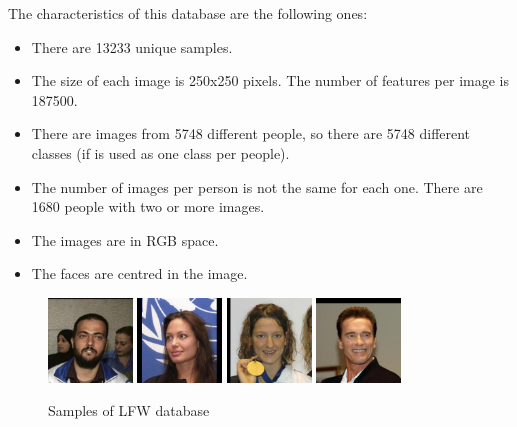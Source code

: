 The characteristics of this database are the following ones:
\begin{itemize}
 \item There are 13233 unique samples.
 \item The size of each image is 250x250 pixels. The number of features per image is 187500.
 \item There are images from 5748 different people, so there are 5748 different classes (if is used as one class per people).
\item The number of images per person is not the same for each one. There are 1680 people with two or more images.
\item The images are in RGB space.
\item The faces are centred in the image.\\
\end{itemize}
\begin{figure}[htb]
\centering
\includegraphics[width=0.2\textwidth]{images_databases/LFW/1.jpg}
\includegraphics[width=0.2\textwidth]{images_databases/LFW/2.jpg}
\includegraphics[width=0.2\textwidth]{images_databases/LFW/3.jpg}
\includegraphics[width=0.2\textwidth]{images_databases/LFW/4.jpg}
\caption{Samples of LFW database} \label{fig:LFW1}
\end{figure}

